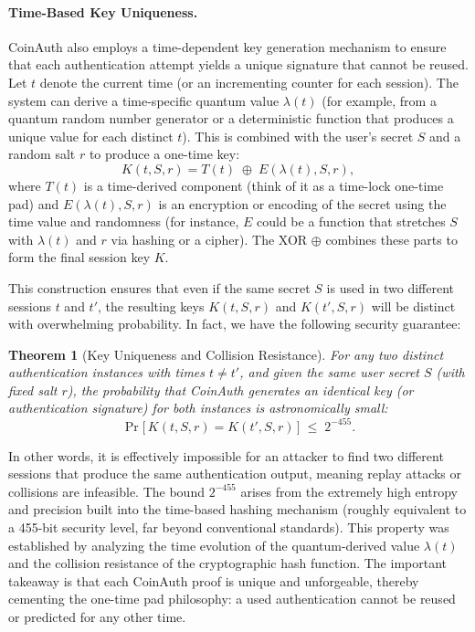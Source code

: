 \documentclass[10pt,letterpaper]{article}
\newtheorem*{theorem*}{Theorem}
\begin{document}
\paragraph{Time-Based Key Uniqueness.} CoinAuth also employs a time-dependent key generation mechanism to ensure that each authentication attempt yields a unique signature that cannot be reused. Let \( t \) denote the current time (or an incrementing counter for each session). The system can derive a time-specific quantum value \( \lambda(t) \) (for example, from a quantum random number generator or a deterministic function that produces a unique value for each distinct \( t \)). This is combined with the user’s secret \( S \) and a random salt \( r \) to produce a one-time key:
\[
K(t, S, r) = T(t) \;\oplus\; E(\lambda(t), S, r),
\]
where \( T(t) \) is a time-derived component (think of it as a time-lock one-time pad) and \( E(\lambda(t), S, r) \) is an encryption or encoding of the secret using the time value and randomness (for instance, \( E \) could be a function that stretches \( S \) with \( \lambda(t) \) and \( r \) via hashing or a cipher). The XOR \( \oplus \) combines these parts to form the final session key \( K \).

This construction ensures that even if the same secret \( S \) is used in two different sessions \( t \) and \( t' \), the resulting keys \( K(t,S,r) \) and \( K(t',S,r) \) will be distinct with overwhelming probability. In fact, we have the following security guarantee:

\begin{theorem*}[Key Uniqueness and Collision Resistance]
For any two distinct authentication instances with times \( t \neq t' \), and given the same user secret \( S \) (with fixed salt \( r \)), the probability that CoinAuth generates an identical key (or authentication signature) for both instances is astronomically small:
\[
\Pr\!\big[\,K(t, S, r) = K(t', S, r)\,\big] \;\le\; 2^{-455}.
\]
\end{theorem*}

In other words, it is effectively impossible for an attacker to find two different sessions that produce the same authentication output, meaning replay attacks or collisions are infeasible. The bound \( 2^{-455} \) arises from the extremely high entropy and precision built into the time-based hashing mechanism (roughly equivalent to a 455-bit security level, far beyond conventional standards). This property was established by analyzing the time evolution of the quantum-derived value \( \lambda(t) \) and the collision resistance of the cryptographic hash function. The important takeaway is that each CoinAuth proof is unique and unforgeable, thereby cementing the one-time pad philosophy: a used authentication cannot be reused or predicted for any other time.
\end{document}
